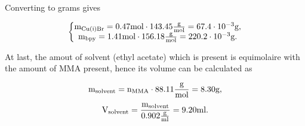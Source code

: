     Converting to grams gives

    $$\left\{\begin{matrix}
        \mathtext[Cu(i)Br]{m} = 0.47\mole \cdot 143.45\MW = 67.4 \cdot10^{-3}\g,\\
        \mathtext[bpy]{m} = 1.41\mole \cdot 156.18\MW = 220.2 \cdot10^{-3}\g.\\
    \end{matrix}\right.$$

    At last, the amout of solvent (ethyl acetate) which is present is equimolaire 
    with the amount of MMA present, hence its volume can be calculated as

    $$\mathtext[solvent]{m} = \mathtext[MMA]{n}\cdot 88.11\MW = 8.30\g,$$
    $$\mathtext[solvent]{V} = \frac{\mathtext[solvent]{m}}{0.902\density} = 9.20\ml.$$
